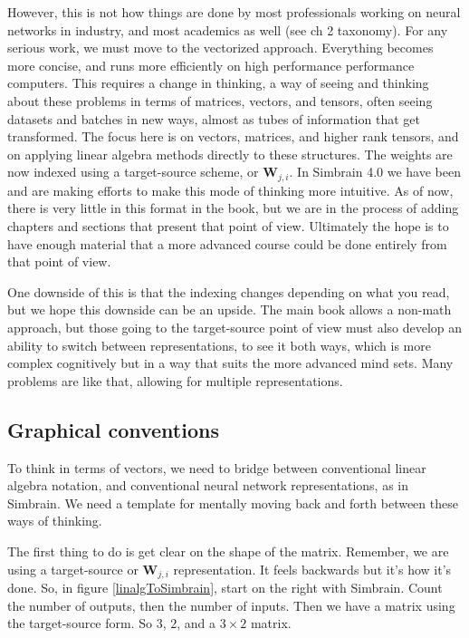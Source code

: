 However, this is not how things are done by most professionals working on neural networks in industry, and most academics as well (see ch 2 taxonomy). For any serious work, we must move to the vectorized approach. Everything becomes more concise, and runs more efficiently on high performance performance computers. This requires a change in thinking, a way of seeing and thinking about these problems in terms of matrices, vectors, and tensors, often seeing datasets and batches in new ways, almost as tubes of information that get transformed. The focus here is on vectors, matrices, and higher rank tensors, and on applying linear algebra methods directly to these structures. The weights are now indexed using a target-source scheme, or $\textbf{W}_{j,i}$. In Simbrain 4.0 we have been and are making efforts to make this mode of thinking more intuitive. As of now, there is very little in this format in the book, but we are in the process of adding chapters and sections that present that point of view. Ultimately the hope is to have enough material that a more advanced course could be done entirely from that point of view.

One downside of this is that the indexing changes depending on what you read, but we hope this downside can be an upside. The main book allows a non-math approach, but those going to the target-source point of view must also develop an ability to switch between representations, to see it both ways, which is more complex cognitively but in a way that suits the more advanced mind sets. Many problems are like that, allowing for multiple representations.


\subsection{Graphical conventions}

To think in terms of vectors, we need to bridge between conventional linear algebra notation, and conventional neural network representations, as in Simbrain. We need a template for mentally moving back and forth between these ways of thinking. 

The first thing to do is get clear on the shape of the matrix. Remember, we are using a target-source or $\textbf{W}_{j,i}$ representation. It feels backwards but it's how it's done. So, in figure \ref{linalgToSimbrain}, start on the right with Simbrain. Count the number of outputs, then the number of inputs. Then we have a matrix using the target-source form. So $3$, $2$, and a $3 \times 2$ matrix.

